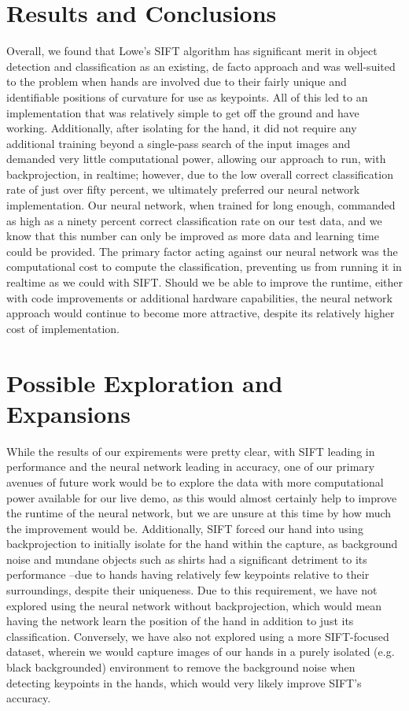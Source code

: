 \section{Results and Conclusions}
\label{results_and_conclusion}

Overall, we found that Lowe's SIFT algorithm has significant merit in object detection and classification as an existing, de facto approach and was well-suited to the problem when hands are involved due to their fairly unique and identifiable positions of curvature for use as keypoints. All of this led to an implementation that was relatively simple to get off the ground and have working. Additionally, after isolating for the hand, it did not require any additional training beyond a single-pass search of the input images and demanded very little computational power, allowing our approach to run, with backprojection, in realtime; however, due to the low overall correct classification rate of just over fifty percent, we ultimately preferred our neural network implementation. Our neural network, when trained for long enough, commanded as high as a ninety percent correct classification rate on our test data, and we know that this number can only be improved as more data and learning time could be provided. The primary factor acting against our neural network was the computational cost to compute the classification, preventing us from running it in realtime as we could with SIFT. Should we be able to improve the runtime, either with code improvements or additional hardware capabilities, the neural network approach would continue to become more attractive, despite its relatively higher cost of implementation.

\section{Possible Exploration and Expansions}
\label{expansions}

While the results of our expirements were pretty clear, with SIFT leading in performance and the neural network leading in accuracy, one of our primary avenues of future work would be to explore the data with more computational power available for our live demo, as this would almost certainly help to improve the runtime of the neural network, but we are unsure at this time by how much the improvement would be. Additionally, SIFT forced our hand into using backprojection to initially isolate for the hand within the capture, as background noise and mundane objects such as shirts had a significant detriment to its performance --due to hands having relatively few keypoints relative to their surroundings, despite their uniqueness. Due to this requirement, we have not explored using the neural network without backprojection, which would mean having the network learn the position of the hand in addition to just its classification. Conversely, we have also not explored using a more SIFT-focused dataset, wherein we would capture images of our hands in a purely isolated (e.g. black backgrounded) environment to remove the background noise when detecting keypoints in the hands, which would very likely improve SIFT's accuracy.